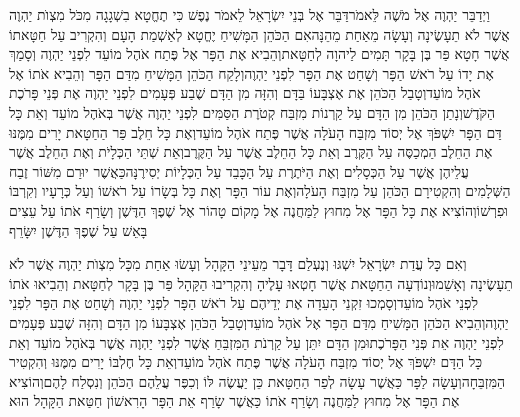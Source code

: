 \documentclass[../main/main.tex]{subfiles}
\begin{document}
\begin{multicols*}{\ncols}
וַיְדַבֵּר יַהְוֶה אֶל מֹשֶׁה לֵּאמֹר\PreVerseSpace{}דַּבֵּר אֶל בְּנֵי יִשְׂרָאֵל לֵאמֹר נֶפֶשׁ כִּי תֶחֱטָא בִשְׁגָגָה מִכֹּל מִצְוֺת יַהְוֶה אֲשֶׁר לֹא תֵעָשֶׂינָה וְעָשָׂה מֵאַחַת מֵהֵנָּה\PreVerseSpace{}אִם הַכֹּהֵן הַמָּשִׁיחַ יֶחֱטָא לְאַשְׁמַת הָעָם וְהִקְרִיב עַל חַטָּאתוֹ אֲשֶׁר חָטָא פַּר בֶּן בָּקָר תָּמִים לַיהוָה לְחַטָּאת\PreVerseSpace{}וְהֵבִיא אֶת הַפָּר אֶל פֶּתַח אֹהֶל מוֹעֵד לִפְנֵי יַהְוֶה וְסָמַךְ אֶת יָדוֹ עַל רֹאשׁ הַפָּר וְשָׁחַט אֶת הַפָּר לִפְנֵי יַהְוֶה\PreVerseSpace{}וְלָקַח הַכֹּהֵן הַמָּשִׁיחַ מִדַּם הַפָּר וְהֵבִיא אֹתוֹ אֶל אֹהֶל מוֹעֵד\PreVerseSpace{}וְטָבַל הַכֹּהֵן אֶת אֶצְבָּעוֹ בַּדָּם וְהִזָּה מִן הַדָּם שֶׁבַע פְּעָמִים לִפְנֵי יַהְוֶה אֶת פְּנֵי פָּרֹכֶת הַקֹּדֶשׁ\PreVerseSpace{}וְנָתַן הַכֹּהֵן מִן הַדָּם עַל קַרְנוֹת מִזְבַּח קְטֹרֶת הַסַּמִּים לִפְנֵי יַהְוֶה אֲשֶׁר בְּאֹהֶל מוֹעֵד וְאֵת כָּל דַּם הַפָּר יִשְׁפֹּךְ אֶל יְסוֹד מִזְבַּח הָעֹלָה אֲשֶׁר פֶּתַח אֹהֶל מוֹעֵד\PreVerseSpace{}וְאֶת כָּל חֵלֶב פַּר הַחַטָּאת יָרִים מִמֶּנּוּ אֶת הַחֵלֶב הַמְכַסֶּה עַל הַקֶּרֶב וְאֵת כָּל הַחֵלֶב אֲשֶׁר עַל הַקֶּרֶב\PreVerseSpace{}וְאֵת שְׁתֵּי הַכְּלָיֹת וְאֶת הַחֵלֶב אֲשֶׁר עֲלֵיהֶן אֲשֶׁר עַל הַכְּסָלִים וְאֶת הַיֹּתֶרֶת עַל הַכָּבֵד עַל הַכְּלָיוֹת יְסִירֶנָּה\PreVerseSpace{}כַּאֲשֶׁר יוּרַם מִשּׁוֹר זֶבַח הַשְּׁלָמִים וְהִקְטִירָם הַכֹּהֵן עַל מִזְבַּח הָעֹלָה\PreVerseSpace{}וְאֶת עוֹר הַפָּר וְאֶת כָּל בְּשָׂרוֹ עַל רֹאשׁוֹ וְעַל כְּרָעָיו וְקִרְבּוֹ וּפִרְשׁוֹ\PreVerseSpace{}וְהוֹצִיא אֶת כָּל הַפָּר אֶל מִחוּץ לַמַּחֲנֶה אֶל מָקוֹם טָהוֹר אֶל שֶׁפֶךְ הַדֶּשֶׁן וְשָׂרַף אֹתוֹ עַל עֵצִים בָּאֵשׁ עַל שֶׁפֶךְ הַדֶּשֶׁן יִשָּׂרֵף\OpenSection{}\par
{}וְאִם כָּל עֲדַת יִשְׂרָאֵל יִשְׁגּוּ וְנֶעְלַם דָּבָר מֵעֵינֵי הַקָּהָל וְעָשׂוּ אַחַת מִכָּל מִצְוֺת יַהְוֶה אֲשֶׁר לֹא תֵעָשֶׂינָה וְאָשֵׁמוּ\PreVerseSpace{}וְנוֹדְעָה הַחַטָּאת אֲשֶׁר חָטְאוּ עָלֶיהָ וְהִקְרִיבוּ הַקָּהָל פַּר בֶּן בָּקָר לְחַטָּאת וְהֵבִיאוּ אֹתוֹ לִפְנֵי אֹהֶל מוֹעֵד\PreVerseSpace{}וְסָמְכוּ זִקְנֵי הָעֵדָה אֶת יְדֵיהֶם עַל רֹאשׁ הַפָּר לִפְנֵי יַהְוֶה וְשָׁחַט אֶת הַפָּר לִפְנֵי יַהְוֶה\PreVerseSpace{}וְהֵבִיא הַכֹּהֵן הַמָּשִׁיחַ מִדַּם הַפָּר אֶל אֹהֶל מוֹעֵד\PreVerseSpace{}וְטָבַל הַכֹּהֵן אֶצְבָּעוֹ מִן הַדָּם וְהִזָּה שֶׁבַע פְּעָמִים לִפְנֵי יַהְוֶה אֵת פְּנֵי הַפָּרֹכֶת\PreVerseSpace{}וּמִן הַדָּם יִתֵּן עַל קַרְנֹת הַמִּזְבֵּחַ אֲשֶׁר לִפְנֵי יַהְוֶה אֲשֶׁר בְּאֹהֶל מוֹעֵד וְאֵת כָּל הַדָּם יִשְׁפֹּךְ אֶל יְסוֹד מִזְבַּח הָעֹלָה אֲשֶׁר פֶּתַח אֹהֶל מוֹעֵד\PreVerseSpace{}וְאֵת כָּל חֶלְבּוֹ יָרִים מִמֶּנּוּ וְהִקְטִיר הַמִּזְבֵּחָה\PreVerseSpace{}וְעָשָׂה לַפָּר כַּאֲשֶׁר עָשָׂה לְפַר הַחַטָּאת כֵּן יַעֲשֶׂה לּוֹ וְכִפֶּר עֲלֵהֶם הַכֹּהֵן וְנִסְלַח לָהֶם\PreVerseSpace{}וְהוֹצִיא אֶת הַפָּר אֶל מִחוּץ לַמַּחֲנֶה וְשָׂרַף אֹתוֹ כַּאֲשֶׁר שָׂרַף אֵת הַפָּר הָרִאשׁוֹן חַטַּאת הַקָּהָל הוּא\OpenSection{}\par

\end{multicols*}
\end{document}
